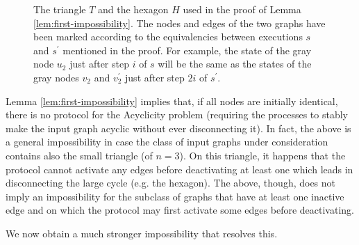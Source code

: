 \documentclass[preprint]{elsarticle}
\begin{document}
\begin{figure}[!hbtp]
\caption{The triangle $T$ and the hexagon $H$ used in the proof of Lemma \ref{lem:first-impossibility}. The nodes and edges of the two graphs have been marked according to the equivalencies between executions $s$ and $s^\prime$ mentioned in the proof. For example, the state of the gray node $u_2$ just after step $i$ of $s$ will be the same as the states of the gray nodes $v_2$ and $v_2^\prime$ just after step $2i$ of $s^\prime$.} \label{fig:3-cycle}
\end{figure}

Lemma \ref{lem:first-impossibility} implies that, if all nodes are initially identical, there is no protocol for the Acyclicity problem (requiring the processes to stably make the input graph acyclic without ever disconnecting it). In fact, the above is a general impossibility in case the class of input graphs under consideration contains also the small triangle (of $n=3$). On this triangle, it happens that the protocol cannot activate any edges before deactivating at least one which leads in disconnecting the large cycle (e.g. the hexagon). The above, though, does not imply an impossibility for the subclass of graphs that have at least one inactive edge and on which the protocol may first activate some edges before deactivating.

We now obtain a much stronger impossibility that resolves this.
\end{document}
